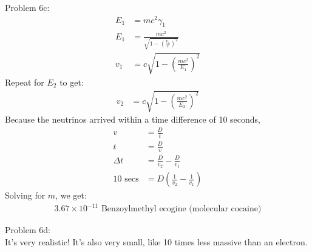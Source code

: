\documentclass[10pt,letter,preprint]{aastex}
\newcommand{\rp}{\right)}
\newcommand{\lp}{\left(}
\begin{document}
Problem 6c:\\
\begin{align}
E_1 &= mc^2 \gamma_1\\
E_1 &= \frac{mc^2 }{\sqrt{1 - \lp \frac{v_1}{c} \rp ^2}}\\
v_1 &= c\sqrt{1-\lp \frac{mc^2}{E_1} \rp^2}
\end{align}
Repeat for $E_2$ to get:
\begin{align}
v_2 &= c\sqrt{1-\lp \frac{mc^2}{E_2} \rp^2}
\end{align}
Because the neutrinos arrived within a time difference of 10 seconds,
\begin{align}
v &= \frac{D}{t}\\
t &= \frac{D}{v}\\
\Delta t &= \frac{D}{ v_2} - \frac{D}{v_1}\\
10 \textrm{ secs} &= D \lp \frac{1}{v_2} - \frac{1}{v_1} \rp
\end{align}
Solving for $m$, we get:
\begin{align}
\boxed{3.67 \times 10^{-11} \textrm{ Benzoylmethyl ecogine (molecular cocaine)}}%
\end{align}

Problem 6d:\\
It's very realistic! It's also very small, like 10 times less massive than an electron.  
\end{document}
